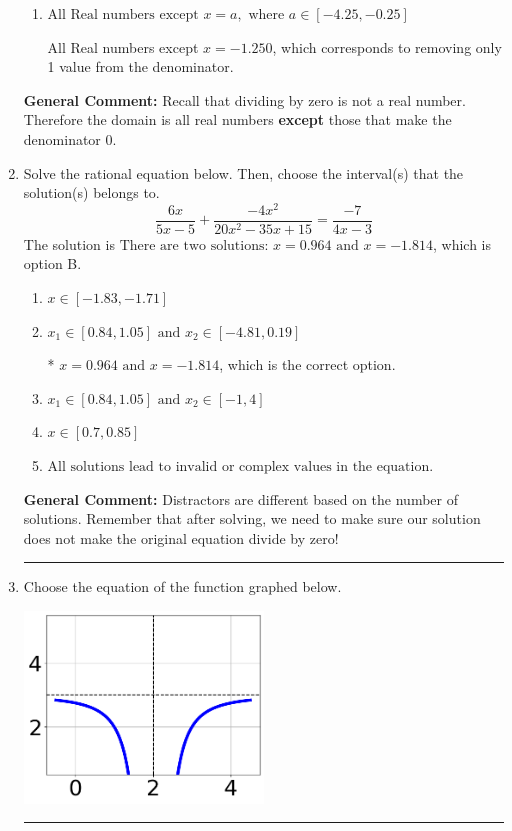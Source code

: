 \documentclass{extbook}[14pt]
\newcommand{\litem}[1]{\item #1

\rule{\textwidth}{0.4pt}}
\begin{document}
\begin{enumerate}
{\begin{enumerate}[label=\Alph*.]
All Real numbers except $x = -20.000$, which corresponds to removing a distractor value from the denominator.
\item \( \text{All Real numbers except } x = a, \text{ where } a \in [-4.25, -0.25] \)

All Real numbers except $x = -1.250$, which corresponds to removing only 1 value from the denominator.
\end{enumerate}

\textbf{General Comment:} Recall that dividing by zero is not a real number. Therefore the domain is all real numbers \textbf{except} those that make the denominator 0.
}
\litem{
Solve the rational equation below. Then, choose the interval(s) that the solution(s) belongs to.
\[ \frac{6x}{5x -5} + \frac{-4x^{2}}{20x^{2} -35 x + 15} = \frac{-7}{4x -3} \]
The solution is \( \text{There are two solutions: } x = 0.964 \text{ and } x = -1.814 \), which is option B.\begin{enumerate}[label=\Alph*.]
\item \( x \in [-1.83,-1.71] \)


\item \( x_1 \in [0.84, 1.05] \text{ and } x_2 \in [-4.81,0.19] \)

* $x = 0.964 \text{ and } x = -1.814$, which is the correct option.
\item \( x_1 \in [0.84, 1.05] \text{ and } x_2 \in [-1,4] \)


\item \( x \in [0.7,0.85] \)


\item \( \text{All solutions lead to invalid or complex values in the equation.} \)


\end{enumerate}

\textbf{General Comment:} Distractors are different based on the number of solutions. Remember that after solving, we need to make sure our solution does not make the original equation divide by zero!
}
\litem{
Choose the equation of the function graphed below.

\begin{center}
    \includegraphics[width=0.5\textwidth]{../Figures/rationalGraphToEquationCopyA.png}
\end{center}



}
\end{enumerate}
\end{document}
